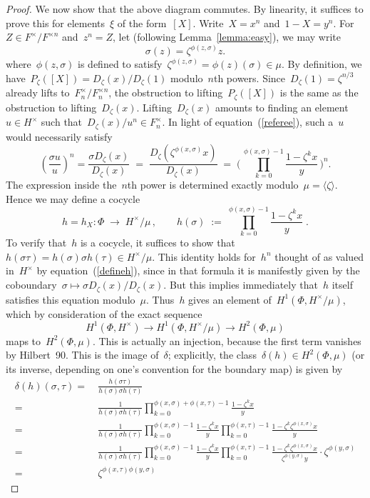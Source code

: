\documentclass[12pt,reqno]{amsart}
\theoremstyle{definition}
\newcommand{\changed}[1]{{#1}}
\def\be{\begin{equation}}
\def\ee{\end{equation}}
\def\={\;=\;}
\def\s{\sigma} \def\a{\alpha}  \def\g{\gamma}   \def\z{\zeta}  \def\i{^{-1}}
\def\nn{n}
\def\wD{D}  %
\begin{document}
\begin{proof}
We now show that the above diagram commutes. By linearity, it suffices to 
prove this for elements~$\xi$ of the form~$[X]$. Write~$X=x^\nn$ 
and~$1-X=y^\nn$. For~$Z \in F^{\times}/F^{\times \nn}$ and~$z^n = Z$, let 
(following Lemma~\ref{lemma:easy}), \changed{we may write}
$$
\sigma(z) = \z^{\phi(z,\sigma)} z.
$$ 
\changed{where~$\phi(z,\sigma)$ is defined to satisfy~$\z^{\phi(z,\sigma)} = \phi(z)(\sigma) \in \mu$.}
By definition, we have~$P_{\z}([X]) = \changed{D_\z(x)/D_{\z}(1)}$ modulo~$\nn$th powers. 
\changed{Since~$D_{\z}(1) = \z^{\nn/3}$  already lifts to~$F^{\times}_{\nn}/F^{\times \nn}_{\nn}$,
the obstruction to lifting~$P_{\z}([X])$ is the same as the obstruction
to lifting~$\wD_{\z}(x)$.}
Lifting~$\wD_{\z}(x)$ amounts to finding an 
element~$u \in H^{\times}$ such that~$\wD_\z(x)/u^{\nn}  \in F_\nn^{\times}$. 
\changed{In light of equation~(\ref{referee}),}
such a~$u$ would necessarily satisfy
\be
\label{defineh}
\left(\frac{\sigma u}{u}\right)^\nn = \frac{\sigma \wD_\z(x)}{\wD_\z(x)}
\= \frac{\wD_\z(\z^{\phi(x,\sigma)} x)}{\wD_\z(x)} \=
\biggl(\,\prod_{k=0}^{\phi(x,\sigma) - 1} \frac{1- \z^k x}{y}\,\biggr)^\nn.
\ee
The expression inside the~$\nn$th power is determined exactly 
modulo~$\mu = \langle \z \rangle$.  Hence we may define a cocycle
$$
h = h_{X}: \Phi \;\to\; H^\times/\mu\,, \qquad h(\s)\;:=\;
\prod_{k=0}^{\phi(x,\sigma)-1}\frac{1- \z^k x}{y} \;.
$$
\changed{To verify that~$h$ is a cocycle, it suffices to show 
that~$h(\sigma \tau) = h(\sigma) \sigma h(\tau) \in H^{\times}/\mu$. This identity holds
for~$h^n$  thought of as valued in~$H^{\times}$ by equation~(\ref{defineh}),
since in that formula it is manifestly given by the coboundary~$\sigma \mapsto \sigma 
\wD_\z(x)/\wD_\z(x)$. But this implies immediately that~$h$ itself satisfies this
equation modulo~$\mu$.}
Thus~$h$ gives an element of~$H^1(\Phi,H^\times/\mu)$, which by consideration 
of the exact sequence
$$
H^1(\Phi,H^{\times}) \longrightarrow H^1(\Phi,H^{\times}/\mu) 
\longrightarrow H^2(\Phi,\mu)
$$
maps to~$H^2(\Phi,\mu)$. This is actually an injection, because the 
first term vanishes by Hilbert~90. This is the image of~$\delta$; 
explicitly, the class~$\delta(h) \in H^2(\Phi,\mu)$ \changed{(or its inverse,
depending on one's convention for the boundary map)} is given by
\begin{align*}
\delta(h)(\sigma,\tau) =  & 
\ \frac{h(\sigma \tau)}{h(\sigma) \sigma h(\tau)} \\
= & 
\ \frac{1}{h(\sigma) \sigma h(\tau)} 
\prod_{k=0}^{\phi(x,\sigma) + \phi(x,\tau) - 1} \frac{1 - \z^k x}{y} \\
= & 
\ \frac{1}{h(\sigma)  \sigma h(\tau)} 
\prod_{k=0}^{\phi(x,\sigma)  - 1} \frac{1 - \z^k x}{y}
\prod_{k=0}^{\phi(x,\tau)  - 1} \frac{1 - \z^k \z^{\phi(x,\sigma)} x}{y}
\\
 = & \ \frac{1}{h(\sigma) \sigma h(\tau)} 
\prod_{k=0}^{\phi(x,\sigma)  - 1} \frac{1 - \z^k x}{y}
\prod_{k=0}^{\phi(x,\tau)  - 1} 
\frac{1 - \z^k \z^{\phi(x,\sigma)} x}{\z^{\phi(y,\sigma)} y} \cdot
\z^{\phi(y,\sigma)} 
\\
 = & \ \z^{\phi(x,\tau) \phi(y,\sigma)}
\end{align*} 


\end{proof}
\end{document}
